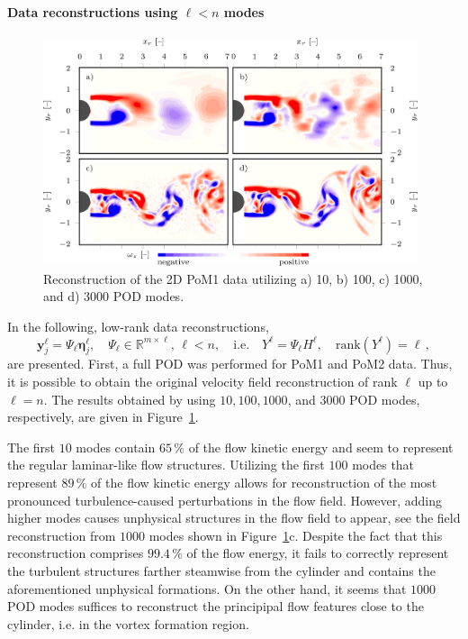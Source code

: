 {{{{\paragraph{Data reconstructions using $\ell < n$ modes}
\begin{figure}[htbp]
    \centering
    \includegraphics[width=0.98\textwidth]{02_images/00_export/figure24.png}
    \caption{Reconstruction of the 2D PoM1 data utilizing a) 10, b) 100, c) 1000, and d) 3000 POD modes.}
    \label{fig:PoM1Rec}
\end{figure}
In the following, low-rank data reconstructions,
\begin{equation}
\label{eq:}
    \bm{y}_{j}^{\ell} = \Psi_{\ell}\bm{\eta}_{j}^{\ell},\quad \Psi_{\ell}\in\mathbb{R}^{m\times \ell},\,\ell < n,\quad\text{i.e.}\quad Y^{\ell} = \Psi_{\ell}H^{\ell},\quad\mathrm{rank}(Y^{\ell}) = \ell\,,
\end{equation}
are presented. First, a full POD was performed for PoM1 and PoM2 data. Thus, it is possible to obtain the original velocity field reconstruction of rank $\ell$ up to $\ell = n$. The results obtained by using $10,100,1000$, and $3000$ POD modes, respectively, are given in Figure~\ref{fig:PoM1Rec}.

The first $10$ modes contain $65\,\%$ of the flow kinetic energy and seem to represent the regular laminar-like flow structures. Utilizing the first $100$ modes that represent $89\,\%$ of the flow kinetic energy allows for reconstruction of the most pronounced turbulence-caused perturbations in the flow field. However, adding higher modes causes unphysical structures in the flow field to appear, see the field reconstruction from $1000$ modes shown in Figure~\ref{fig:PoM1Rec}c. Despite the fact that this reconstruction comprises $99.4\,\%$ of the flow energy, it fails to correctly represent the turbulent structures farther steamwise from the cylinder and contains the aforementioned unphysical formations. On the other hand, it seems that $1000$ POD modes suffices to reconstruct the principipal flow features close to the cylinder, i.e. in the vortex formation region.

}}}}
